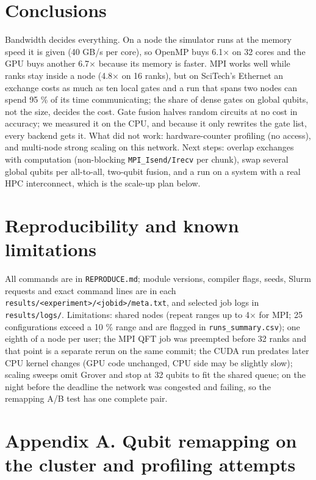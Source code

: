 \documentclass[10pt,a4paper]{article}
\begin{document}
\section{Conclusions}



Bandwidth decides everything. On a node the simulator runs at the memory speed it is given (40 GB/s per core), so OpenMP buys 6.1$\times$ on 32 cores and the GPU buys another 6.7$\times$ because its memory is faster. MPI works well while ranks stay inside a node (4.8$\times$ on 16 ranks), but on SciTech's Ethernet an exchange costs as much as ten local gates and a run that spans two nodes can spend 95 \% of its time communicating; the share of dense gates on global qubits, not the size, decides the cost. Gate fusion halves random circuits at no cost in accuracy; we measured it on the CPU, and because it only rewrites the gate list, every backend gets it. What did not work: hardware-counter profiling (no access), and multi-node strong scaling on this network. Next steps: overlap exchanges with computation (non-blocking \texttt{MPI\_Isend/Irecv} per chunk), swap several global qubits per all-to-all, two-qubit fusion, and a run on a system with a real HPC interconnect, which is the scale-up plan below.



\section{Reproducibility and known limitations}



All commands are in \texttt{REPRODUCE.md}; module versions, compiler flags, seeds, Slurm requests and exact command lines are in each \texttt{results/<experiment>/<jobid>/meta.txt}, and selected job logs in \texttt{results/logs/}. Limitations: shared nodes (repeat ranges up to 4$\times$ for MPI; 25 configurations exceed a 10 \% range and are flagged in \texttt{runs\_summary.csv}); one eighth of a node per user; the MPI QFT job was preempted before 32 ranks and that point is a separate rerun on the same commit; the CUDA run predates later CPU kernel changes (GPU code unchanged, CPU side may be slightly slow); scaling sweeps omit Grover and stop at 32 qubits to fit the shared queue; on the night before the deadline the network was congested and failing, so the remapping A/B test has one complete pair.



\section{Appendix A. Qubit remapping on the cluster and profiling attempts}
\end{document}
